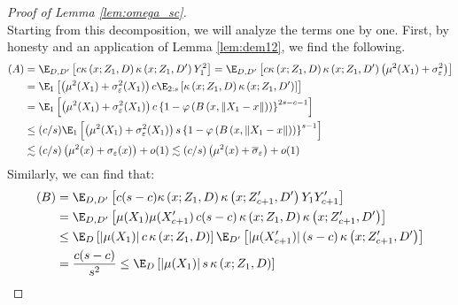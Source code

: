 \begin{proof}[Proof of Lemma \ref{lem:omega_sc}]
\begin{equation}
	\end{equation}
	Starting from this decomposition, we will analyze the terms one by one.
	First, by honesty and an application of Lemma \ref{lem:dem12}, we find the following.
	\begin{equation}
		\begin{aligned}
            (A) & = 
			\E_{D, D^{\prime}}\left[c\kappa\left(x; Z_{1}, D\right)\kappa\left(x; Z_{1}, D^{\prime}\right)Y_{1}^{2}\right]
			= \E_{D, D^{\prime}}\left[c\kappa\left(x; Z_{1}, D\right)\kappa\left(x; Z_{1}, D^{\prime}\right)\left(\mu^2(X_1) + \sigma_{\varepsilon}^{2}\right)\right]                                 \\
			 & = \E_{1}\left[\left(\mu^2(X_1) + \sigma_{\varepsilon}^{2}(X_1)\right) c\E_{2:s}\left[\kappa\left(x; Z_{1}, D\right)\kappa\left(x; Z_{1}, D^{\prime}\right)\right]\right] \\
			 & = \E_{1}\left[\left(\mu^2(X_1) + \sigma_{\varepsilon}^{2}(X_1)\right) c\left\{1 - \varphi\left(B\left(x, \|X_1 - x\|\right)\right)\right\}^{2s-c-1}\right]                        \\
			 & \leq (c/s) \E_{1}\left[\left(\mu^2(X_1) + \sigma_{\varepsilon}^{2}(X_1)\right) s\left\{1 - \varphi\left(B\left(x, \|X_1 - x\|\right)\right)\right\}^{s-1}\right]                  \\
			 & \lesssim (c/s)\left(\mu^2(x) + \sigma_{\varepsilon}(x)\right) + o(1)
			\lesssim (c/s)\left(\mu^2(x) + \overline{\sigma}_{\varepsilon}\right) + o(1)
		\end{aligned}
	\end{equation}
	Similarly, we can find that:
	\begin{equation}
		\begin{aligned}
            (B)
			 & = \E_{D, D^{\prime}}\left[c(s-c) \kappa\left(x; Z_{1}, D\right)\kappa\left(x; Z_{c+1}^{\prime}, D^{\prime}\right)Y_{1}Y_{c+1}^{\prime}\right]                                          \\
			 & = \E_{D, D^{\prime}}\left[\mu(X_1)\mu(X_{c+1}^{\prime}) \, c(s-c) \, \kappa\left(x; Z_{1}, D\right)\kappa\left(x; Z_{c+1}^{\prime}, D^{\prime}\right)\right] \\
			 & \leq \E_{D}\left[|\mu(X_1)| \, c \, \kappa\left(x; Z_{1}, D\right)\right]
			\E_{D^{\prime}}\left[|\mu(X_{c+1}^{\prime})| \, (s-c) \, \kappa\left(x; Z_{c+1}^{\prime}, D^{\prime}\right)\right]                                                                               \\
			 & = \frac{c (s-c)}{s^2} \leq \E_{D}\left[|\mu(X_1)| \, s \, \kappa\left(x; Z_{1}, D\right)\right]

\end{aligned}
\end{equation}
\end{proof}
